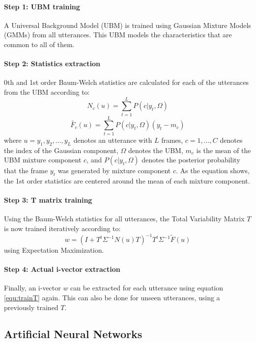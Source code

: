 \paragraph*{Step 1: UBM training} A Universal Background Model (UBM) is trained using Gaussian Mixture Models (GMMs) from all utterances. This UBM models the characteristics that are common to all of them.
\paragraph*{Step 2: Statistics extraction} 0th and 1st order Baum-Welch statistics are calculated for each of the utterances from the UBM according to:
\begin{equation}
N_c(u)=\sum_{t=1}^{L} P(c|y_t,\Omega)
\end{equation}
\begin{equation}
\widetilde{F_c}(u)=\sum_{t=1}^{L} P(c|y_t,\Omega)(y_t-m_c)
\end{equation}
where $u={y_1,y_2,...,y_L}$ denotes an utterance with $L$ frames, $c=1,...,C$ denotes the index of the Gaussian component, $\Omega$ denotes the UBM,  $m_c$ is the mean of the UBM mixture component $c$, and $P(c|y_t,\Omega)$ denotes the posterior probability that the frame $y_t$ was generated by mixture component $c$. As the equation shows, the 1st order statistics are centered around the mean of each mixture component.\\
\paragraph*{Step 3: T matrix training}
Using the Baum-Welch statistics for all utterances, the Total Variability Matrix $T$ is now trained iteratively according to:
\begin{equation}\label{equ:trainT}
w = (I+T^t \Sigma^{-1} N (u) T)^{-1}T^t \Sigma^{-1} \widetilde{F}(u)
\end{equation}
using Expectation Maximization.
\paragraph*{Step 4: Actual i-vector extraction}
Finally, an i-vector $w$ can be extracted for each utterance using equation \ref{equ:trainT} again. This can also be done for unseen utterances, using a previously trained $T$.


\subsection{Artificial Neural Networks}


